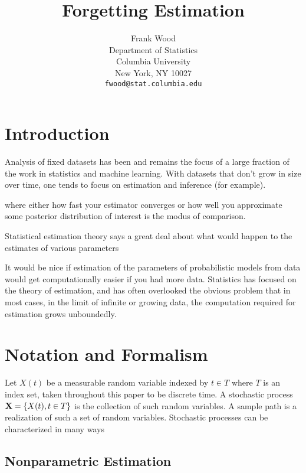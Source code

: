 \documentclass{article} %
\title{Forgetting Estimation}
\author{
Frank Wood\\%
Department of Statistics\\
Columbia University\\
New York, NY 10027\\
\texttt{fwood@stat.columbia.edu}%
}
\begin{document}
\maketitle

\begin{abstract}

\end{abstract}

\section{Introduction}

Analysis of fixed datasets has been and remains the focus of a large fraction of the work in statistics and machine learning.  With datasets that don't grow in size over time, one tends to focus on estimation and inference (for example).

 where either how fast your estimator converges or how well you approximate some posterior distribution of interest is the modus of comparison.

Statistical estimation theory says a great deal about what would happen to the estimates of various parameters

It would be nice if estimation of the parameters of probabilistic models from data would get computationally easier if you had more data.  Statistics has focused on the theory of estimation, and has often overlooked the obvious problem that in most cases, in the limit of infinite or growing data, the computation required for estimation grows unboundedly.  

\section{Notation and Formalism}

Let $X(t)$ be a measurable random variable indexed by $t \in T$ where $T$ is an index set, taken throughout this paper to be discrete time.   A stochastic process ${\bf X} = \{X(t), t \in T\}$ is the collection of such random variables.  A sample path is a realization of such a set of random variables.  Stochastic processes can be characterized in many ways

\subsection{Nonparametric Estimation}
\end{document}

